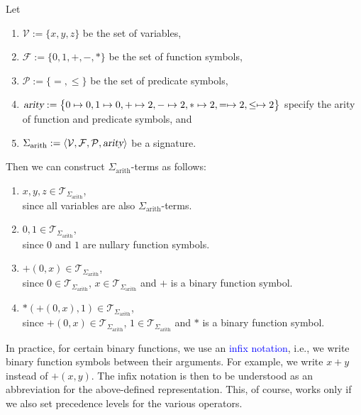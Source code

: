 \exampleEng
Let
\begin{enumerate}
\item $\mathcal{V} := \{ x, y, z \}$ be the set of variables,
\item $\mathcal{F} := \{ 0, 1, \mathtt{+}, \mathtt{-}, * \}$ be the set of function symbols,
\item $\mathcal{P} := \{\mathtt{=}, \leq\}$ be the set of predicate symbols,
\item $\textsl{arity} := \bigl\{ 0 \mapsto 0, 1 \mapsto 0, \mathtt{+} \mapsto 2, \mathtt{-} \mapsto 2,
                                 * \mapsto 2, = \mapsto 2, \leq \mapsto 2 \bigr\}$
      specify the arity of function and predicate symbols, and
\item $\Sigma_\mathrm{arith} := \langle \mathcal{V}, \mathcal{F}, \mathcal{P}, \textsl{arity} \rangle$
      be a signature.
\end{enumerate}
Then we can construct $\Sigma_{\mathrm{arith}}$-terms as follows:
\begin{enumerate}
\item $x, y, z \in \mathcal{T}_{\Sigma_{\mathrm{arith}}}$, \\[0.2cm]
      since all variables are also $\Sigma_{\mathrm{arith}}$-terms.
\item $0, 1 \in \mathcal{T}_{\Sigma_{\mathrm{arith}}}$,  \\[0.2cm]
      since $0$ and $1$ are nullary function symbols.
\item $\mathtt{+}(0,x) \in \mathcal{T}_{\Sigma_{\mathrm{arith}}}$, \\[0.2cm]
      since $0 \in \mathcal{T}_{\Sigma_{\mathrm{arith}}}$, $x \in \mathcal{T}_{\Sigma_{\mathrm{arith}}}$ and 
      $\mathtt{+}$ is a binary function symbol.
\item $*(\mathtt{+}(0,x),1) \in \mathcal{T}_{\Sigma_{\mathrm{arith}}}$, \\[0.2cm]
      since $\mathtt{+}(0,x) \in \mathcal{T}_{\Sigma_{\mathrm{arith}}}$, $1 \in \mathcal{T}_{\Sigma_{\mathrm{arith}}}$ and
      $*$ is a binary function symbol.
\end{enumerate}
In practice, for certain binary functions, we use an \textcolor{blue}{infix notation},
i.e., we write binary function symbols between their arguments. For example,
we write $x+y$ instead of $+(x,y)$. The infix notation is then to be understood as an abbreviation for the
above-defined representation. This, of course, works only if we also set precedence levels for the various operators.
\eox


